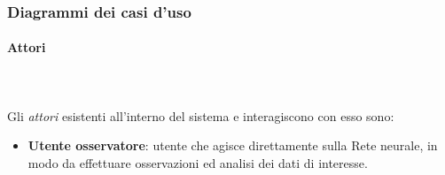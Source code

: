 \subsubsection{Diagrammi dei casi d'uso}
\label{casi d'uso}
\paragraph{Attori}\mbox{}\\\\
\label{Attori}
\noindent
Gli \textit{attori} esistenti all'interno del sistema e  interagiscono con esso sono:
\begin{itemize}
\item \textbf{Utente osservatore}: utente che agisce direttamente sulla Rete neurale, in modo da effettuare osservazioni ed analisi dei dati di interesse.
\end{itemize}


